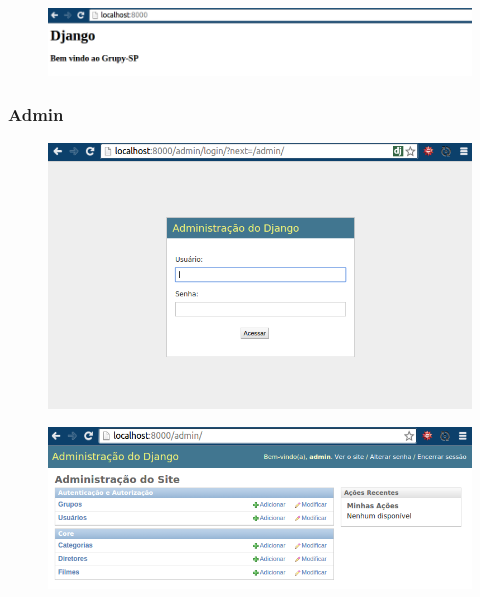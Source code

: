 \documentclass[aspectratio=169]{beamer}
\begin{document}
\begin{frame}

	\begin{figure}[h]
	  \centering
  		\includegraphics[width=.9\paperwidth]{img/HttpResponse.png}
	\end{figure}

\end{frame}

\begin{frame}[fragile]\frametitle{Admin}


\end{frame}

\begin{frame}

	\begin{figure}[h]
	  \centering
  		\includegraphics[height=.9\paperheight]{img/admin1.png}
	\end{figure}

\end{frame}

\begin{frame}

	\begin{figure}[h]
	  \centering
  		\includegraphics[width=.9\paperwidth]{img/admin2.png}
	\end{figure}

\end{frame}
\end{document}
